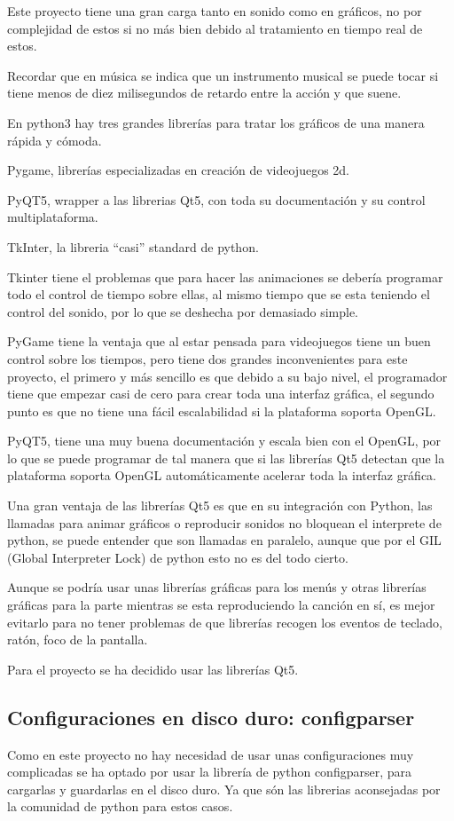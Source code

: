 \documentclass[a4paper,11pt,oneside]{book}
\begin{document}
Este proyecto tiene una gran carga tanto en sonido como en gráficos, no por complejidad de estos si no más bien debido al tratamiento en tiempo real de estos.

Recordar que en música se indica que un instrumento musical se puede tocar si tiene menos de diez milisegundos de retardo entre la acción y que suene.


En python3 hay tres grandes librerías para tratar los gráficos de una manera rápida y cómoda.

Pygame, librerías especializadas en creación de videojuegos 2d.

PyQT5, wrapper a las librerias Qt5, con toda su documentación y su control multiplataforma.

TkInter, la libreria ``casi'' standard de python.


Tkinter tiene el problemas que para hacer las animaciones se debería programar todo el control de tiempo sobre ellas, al mismo tiempo que se esta teniendo el control del sonido, por lo que se deshecha por demasiado simple.

PyGame tiene la ventaja que al estar pensada para videojuegos tiene un buen control sobre los tiempos, pero tiene dos grandes inconvenientes para este proyecto, el primero y más sencillo es que debido a su bajo nivel, el programador tiene que empezar casi de cero para crear toda una interfaz gráfica, el segundo punto es que no tiene una fácil escalabilidad si la plataforma soporta OpenGL.

PyQT5, tiene una muy buena documentación y escala bien con el OpenGL, por lo que se puede programar de tal manera que si las librerías Qt5 detectan que la plataforma soporta OpenGL automáticamente acelerar toda la interfaz gráfica.

Una gran ventaja de las librerías Qt5 es que en su integración con Python, las llamadas para animar gráficos o reproducir sonidos no bloquean el interprete de python, se puede entender que son llamadas en paralelo, aunque que por el GIL (Global Interpreter Lock) de python esto no es del todo cierto.

 
Aunque se podría usar unas librerías gráficas para los menús y otras librerías gráficas para la parte mientras se esta reproduciendo la canción en sí, es mejor evitarlo para no tener problemas de que librerías recogen los eventos de teclado, ratón, foco de la pantalla.

Para el proyecto se ha decidido usar las librerías Qt5.
 

\subsection{Configuraciones en disco duro: configparser}
Como en este proyecto no hay necesidad de usar unas configuraciones muy complicadas se ha optado por usar la librería de python configparser, para cargarlas y guardarlas en el disco duro. Ya que són las librerias aconsejadas por la comunidad de python para estos casos.
\end{document}
